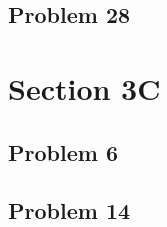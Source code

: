 \documentclass[11pt]{article}
\begin{document}

\subsection{Problem 28}




\section{Section 3C}


\subsection{Problem 6}


\subsection{Problem 14}

\end{document}
